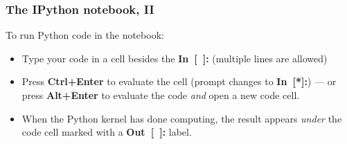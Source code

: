 \documentclass[english,serif,mathserif]{beamer}
\begin{document}
\begin{frame}
  \frametitle{The IPython notebook, II}

  To run Python code in the notebook:
  \begin{itemize}
  \item Type your code in a cell besides the {\ttfamily\bfseries\color{blue}
      In~[~]:} (multiple lines are allowed)
  \item Press \textbf{Ctrl+Enter} to evaluate the cell (prompt changes to
    {\ttfamily\bfseries\color{blue} In~[*]:}) --- or press \textbf{Alt+Enter} to
    evaluate the code \emph{and} open a new code cell.
  \item When the Python kernel has done computing, the result appears \emph{under} the
    code cell marked with a {\ttfamily\bfseries\color{red} Out~[~]:} label.
  \end{itemize}

\end{frame}
\end{document}
